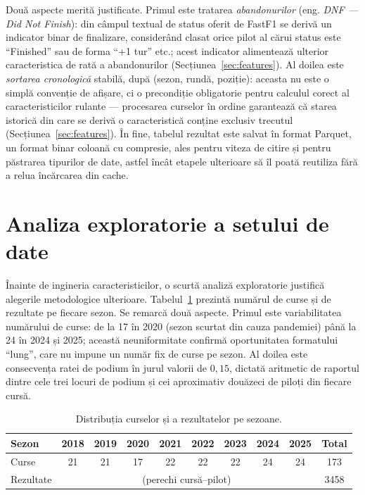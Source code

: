 \documentclass[12pt,a4paper]{report}
\begin{document}
Două aspecte merită justificate. Primul este tratarea \emph{abandonurilor} (eng. \emph{DNF --- Did
Not Finish}): din câmpul textual de status oferit de FastF1 se derivă un indicator binar de
finalizare, considerând clasat orice pilot al cărui status este ``Finished'' sau de forma
``+1 tur'' etc.; acest indicator alimentează ulterior caracteristica de rată a abandonurilor
(Secțiunea~\ref{sec:features}). Al doilea este \emph{sortarea cronologică} stabilă, după (sezon,
rundă, poziție): aceasta nu este o simplă convenție de afișare, ci o precondiție obligatorie pentru
calculul corect al caracteristicilor rulante --- procesarea curselor în ordine garantează că
starea istorică din care se derivă o caracteristică conține exclusiv trecutul
(Secțiunea~\ref{sec:features}). În fine, tabelul rezultat este salvat în format Parquet, un format
binar coloană cu compresie, ales pentru viteza de citire și pentru păstrarea tipurilor de date,
astfel încât etapele ulterioare să îl poată reutiliza fără a relua încărcarea din cache.

\section{Analiza exploratorie a setului de date}
\label{sec:explorare}

Înainte de ingineria caracteristicilor, o scurtă analiză exploratorie justifică alegerile
metodologice ulterioare. Tabelul~\ref{tab:sezoane} prezintă numărul de curse și de rezultate pe
fiecare sezon. Se remarcă două aspecte. Primul este variabilitatea numărului de curse: de la 17 în
2020 (sezon scurtat din cauza pandemiei) până la 24 în 2024 și 2025; această neuniformitate
confirmă oportunitatea formatului ``lung'', care nu impune un număr fix de curse pe sezon. Al
doilea este consecvența ratei de podium în jurul valorii de $0{,}15$, dictată aritmetic de raportul
dintre cele trei locuri de podium și cei aproximativ douăzeci de piloți din fiecare cursă.

\begin{table}[htbp]
  \centering
  \begin{tabular}{l c c c c c c c c c}
    \toprule
    \textbf{Sezon} & 2018 & 2019 & 2020 & 2021 & 2022 & 2023 & 2024 & 2025 & \textbf{Total} \\
    \midrule
    Curse       & 21 & 21 & 17 & 22 & 22 & 22 & 24 & 24 & 173 \\
    Rezultate   & \multicolumn{8}{c}{(perechi cursă--pilot)} & 3458 \\
    \bottomrule
  \end{tabular}
  \caption{Distribuția curselor și a rezultatelor pe sezoane.}
  \label{tab:sezoane}
\end{table}
\end{document}
